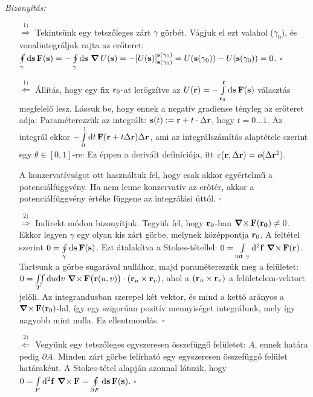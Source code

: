     \emph{Bizonyítás:}
    \begin{itemize}
     \item[$\overset{1)}{\Rightarrow}$] Tekintsünk egy tetszőleges zárt $\gamma$ görbét. Vágjuk el ezt valahol ($\gamma_0$), és vonalintegráljuk rajta az erőteret: $\oint\limits_{\gamma}^{}\mathrm{d}\mathbf{s}\,\mathbf{F}(\mathbf{s})=-\oint\limits_{\gamma}^{}\mathrm{d}\mathbf{s}\,\mathop{\boldsymbol{\nabla}}\nolimits{U}(\mathbf{s})=-[U(\mathbf{s})]_{\mathbf{s}(\gamma_0)}^{\mathbf{s}(\gamma_0)}=U({\mathbf{s}(\gamma_0)})-U({\mathbf{s}(\gamma_0)})=0$. $\square$
     
     \item[$\overset{1)}{\Leftarrow}$] Állítás, hogy egy fix $\mathbf{r}_0$-at lerögzítve az $U(\mathbf{r})=-\int\limits_{\mathbf{r}_0}^{\mathbf{r}}\mathrm{d}\mathbf{s}\,\mathbf{F}(\mathbf{s})$ választás megfelelő lesz. Lássuk be, hogy ennek a negatív gradiense tényleg az erőteret adja: 
     Paraméterezzük az integrált: $\mathbf{s}(t):=\mathbf{r}+t\cdot\Delta\mathbf{r}$, hogy $t=0\dots 1$. Az integrál ekkor $-\int\limits_{0}^{1}\mathrm{d} t\,\mathbf{F}(\mathbf{r}+t\Delta\mathbf{r})\Delta\mathbf{r}$, ami az integrálszámítás alaptétele szerint egy $\theta\in[0,1]$-re:
     Ez éppen a derivált definíciója, itt $\varepsilon(\mathbf{r},\Delta\mathbf{r})={o}(\Delta\mathbf{r}^2)$.
     
     A konzervatívságot ott használtuk fel, hogy csak akkor egyértelmű a potenciálfüggvény. Ha nem lenne konzervatív az erőtér, akkor a potenciálfüggvény értéke függene az integrálási úttól. $\square$
     
     \item[$\overset{2)}{\Rightarrow}$] Indirekt módon bizonyítjuk. Tegyük fel, hogy $\mathbf{r}_0$-ban $\mathop{\boldsymbol{\nabla}\times}\nolimits{\mathbf{F}(\mathbf{r_0})}\neq 0$. Ekkor legyen $\gamma$ egy olyan kis zárt görbe, melynek középpontja $\mathbf{r}_0$. A feltétel szerint $0=\oint\limits_{\gamma}^{}\mathrm{d}\mathbf{s}\,\mathbf{F}(\mathbf{s})$. Ezt átalakítva a Stokes-tétellel: $0=\int\limits_{\text{int }\gamma}^{}\mathrm{d}^2\mathbf{f}\,\mathop{\boldsymbol{\nabla}\times}\nolimits\mathbf{F}(\mathbf{r})$. Tartsunk a görbe sugarával nullához, majd paraméterezzük meg a felületet: $0=\iint\limits_{T}\mathrm{d} u\mathrm{d} v\,\mathop{\boldsymbol{\nabla}\times}\nolimits\mathbf{F}\big(\mathbf{r}(u,v)\big)\cdot(\mathbf{r}_u\times\mathbf{r}_v)$, ahol a $(\mathbf{r}_u\times\mathbf{r}_v)$ a felületelem-vektort jelöli. Az integrandusban szerepel két vektor, és mind a kettő arányos a $\mathop{\boldsymbol{\nabla}\times}\nolimits{\mathbf{F}(\mathbf{r}_0)}$-lal, így egy szigorúan pozitív mennyiséget integrálunk, mely így nagyobb mint nulla. Ez ellentmondás. $\square$
     
     \item[$\overset{2)}{\Leftarrow}$] Vegyünk egy tetszőleges egyszeresen összefüggő felületet: $A$, ennek határa pedig $\partial A$. Minden zárt görbe felírható egy egyszeresen összefüggő felület határaként. A Stokes-tétel alapján azonnal látszik, hogy $0=\int\limits_{F}^{}\mathrm{d}^2\mathbf{f}\,\mathop{\boldsymbol{\nabla}\times}\nolimits\mathbf{F}=\oint\limits_{\partial F}^{}\mathrm{d}\mathbf{s}\,\mathbf{F}(\mathbf{s})$. $\square$
    \end{itemize}
    
